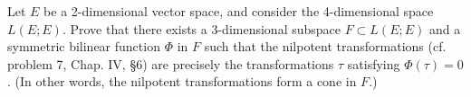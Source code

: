 Let $E$ be a 2-dimensional vector space, and consider the 4-dimensional space $L(E; E)$. Prove that there exists a 3-dimensional subspace $F \subset L(E; E)$ and a symmetric bilinear function $\Phi$ in $F$ such that the nilpotent transformations (cf. problem 7, Chap. IV, §6) are precisely the transformations $\tau$ satisfying $\Phi(\tau) = 0$. (In other words, the nilpotent transformations form a cone in $F$.)
